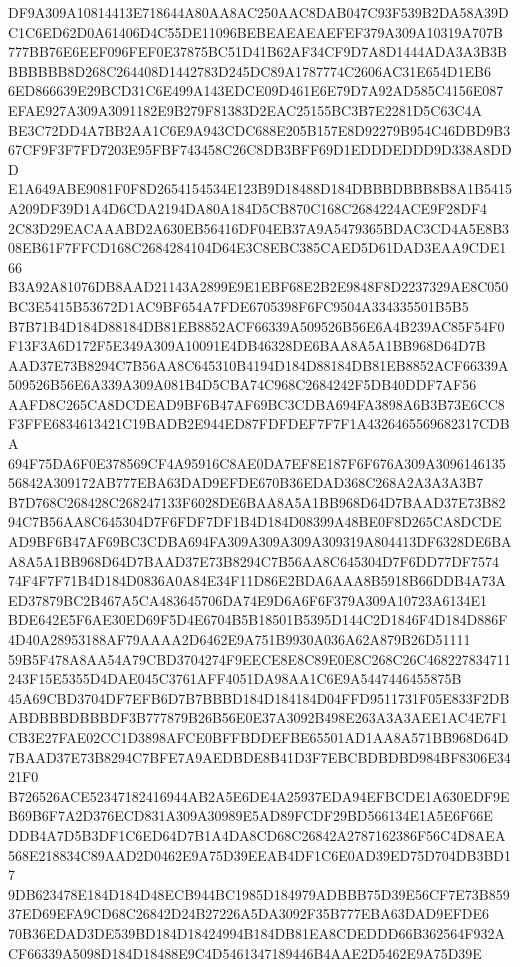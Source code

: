 \documentclass[UTF8,fontset=fandol,zihao=-4,a4paper]{ctexart}
\begin{document}
{{DF9A309A10814413E718644A80AA8AC250AAC8DAB047C93F539B2DA58A39DC1C6ED62D0A61406D4C55DE11096BEBEAEAEAEFEF379A309A10319A707B
777BB76E6EEF096FEF0E37875BC51D41B62AF34CF9D7A8D1444ADA3A3B3BBBBBBB8D268C264408D1442783D245DC89A1787774C2606AC31E654D1EB6
6ED866639E29BCD31C6E499A143EDCE09D461E6E79D7A92AD585C4156E087EFAE927A309A3091182E9B279F81383D2EAC25155BC3B7E2281D5C63C4A
BE3C72DD4A7BB2AA1C6E9A943CDC688E205B157E8D92279B954C46DBD9B367CF9F3F7FD7203E95FBF743458C26C8DB3BFF69D1EDDDEDDD9D338A8DDD
E1A649ABE9081F0F8D2654154534E123B9D18488D184DBBBDBBB8B8A1B5415A209DF39D1A4D6CDA2194DA80A184D5CB870C168C2684224ACE9F28DF4
2C83D29EACAAABD2A630EB56416DF04EB37A9A5479365BDAC3CD4A5E8B308EB61F7FFCD168C2684284104D64E3C8EBC385CAED5D61DAD3EAA9CDE166
B3A92A81076DB8AAD21143A2899E9E1EBF68E2B2E9848F8D2237329AE8C050BC3E5415B53672D1AC9BF654A7FDE6705398F6FC9504A334335501B5B5
B7B71B4D184D88184DB81EB8852ACF66339A509526B56E6A4B239AC85F54F0F13F3A6D172F5E349A309A10091E4DB46328DE6BAA8A5A1BB968D64D7B
AAD37E73B8294C7B56AA8C645310B4194D184D88184DB81EB8852ACF66339A509526B56E6A339A309A081B4D5CBA74C968C2684242F5DB40DDF7AF56
AAFD8C265CA8DCDEAD9BF6B47AF69BC3CDBA694FA3898A6B3B73E6CC8F3FFE6834613421C19BADB2E944ED87FDFDEF7F7F1A4326465569682317CDBA
694F75DA6F0E378569CF4A95916C8AE0DA7EF8E187F6F676A309A309614613556842A309172AB777EBA63DAD9EFDE670B36EDAD368C268A2A3A3A3B7
B7D768C268428C268247133F6028DE6BAA8A5A1BB968D64D7BAAD37E73B8294C7B56AA8C645304D7F6FDF7DF1B4D184D08399A48BE0F8D265CA8DCDE
AD9BF6B47AF69BC3CDBA694FA309A309A309A309319A804413DF6328DE6BAA8A5A1BB968D64D7BAAD37E73B8294C7B56AA8C645304D7F6DD77DF7574
74F4F7F71B4D184D0836A0A84E34F11D86E2BDA6AAA8B5918B66DDB4A73AED37879BC2B467A5CA483645706DA74E9D6A6F6F379A309A10723A6134E1
BDE642E5F6AE30ED69F5D4E6704B5B18501B5395D144C2D1846F4D184D886F4D40A28953188AF79AAAA2D6462E9A751B9930A036A62A879B26D51111
59B5F478A8AA54A79CBD3704274F9EECE8E8C89E0E8C268C26C468227834711243F15E5355D4DAE045C3761AFF4051DA98AA1C6E9A5447446455875B
45A69CBD3704DF7EFB6D7B7BBBD184D184184D04FFD9511731F05E833F2DBABDBBBDBBBDF3B777879B26B56E0E37A3092B498E263A3A3AEE1AC4E7F1
CB3E27FAE02CC1D3898AFCE0BFFBDDEFBE65501AD1AA8A571BB968D64D7BAAD37E73B8294C7BFE7A9AEDBDE8B41D3F7EBCBDBDBD984BF8306E3421F0
B726526ACE52347182416944AB2A5E6DE4A25937EDA94EFBCDE1A630EDF9EB69B6F7A2D376ECD831A309A30989E5AD89FCDF29BD566134E1A5E6F66E
DDB4A7D5B3DF1C6ED64D7B1A4DA8CD68C26842A2787162386F56C4D8AEA568E218834C89AAD2D0462E9A75D39EEAB4DF1C6E0AD39ED75D704DB3BD17
9DB623478E184D184D48ECB944BC1985D184979ADBBB75D39E56CF7E73B85937ED69EFA9CD68C26842D24B27226A5DA3092F35B777EBA63DAD9EFDE6
70B36EDAD3DE539BD184D18424994B184DB81EA8CDEDDD66B362564F932ACF66339A5098D184D18488E9C4D5461347189446B4AAE2D5462E9A75D39E
}}
\end{document}
